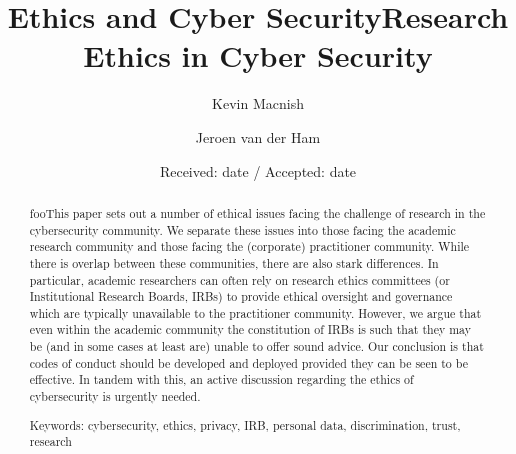 \documentclass{svjour3}                     %
\begin{document}
\title{Ethics and Cyber Security}


\author{Kevin Macnish         \and
        Jeroen van der Ham}



\date{Received: date / Accepted: date}


\maketitle

\title{Research Ethics in Cyber Security}

\begin{abstract}
fooThis paper sets out a number of ethical issues facing the challenge of research in the cybersecurity community.  We separate these issues into those facing the academic research community and those facing the (corporate) practitioner community.  While there is overlap between these communities, there are also stark differences.  In particular, academic researchers can often rely on research ethics committees (or Institutional Research Boards, IRBs) to provide ethical oversight and governance which are typically unavailable to the practitioner community.  However, we argue that even within the academic community the constitution of IRBs is such that they may be (and in some cases at least are) unable to offer sound advice. Our conclusion is that codes of conduct should be developed and deployed provided they can be seen to be effective. In tandem with this, an active discussion regarding the ethics of cybersecurity is urgently needed.

Keywords: cybersecurity, ethics, privacy, IRB, personal data, discrimination, trust, research

\end{abstract}
\end{document}
